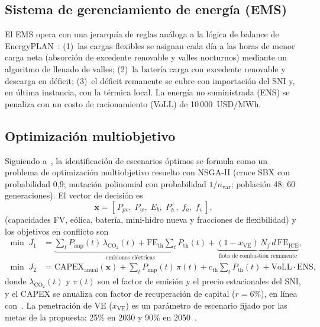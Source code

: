 \documentclass[11pt,a4paper]{article}
\begin{document}
\subsection{Sistema de gerenciamiento de energ\'ia (EMS)}
El EMS opera con una jerarqu\'ia de reglas an\'aloga a la l\'ogica de balance de
EnergyPLAN~\cite{viesi2020}: (1)~las cargas flexibles se asignan cada d\'ia a las horas de
menor carga neta (absorci\'on de excedente renovable y valles nocturnos) mediante un
algoritmo de llenado de valles; (2)~la bater\'ia carga con excedente renovable y descarga
en d\'eficit; (3)~el d\'eficit remanente se cubre con importaci\'on del SNI y, en \'ultima
instancia, con la t\'ermica local. La energ\'ia no suministrada (ENS) se penaliza con un
costo de racionamiento (VoLL) de 10\,000~USD/MWh.

\subsection{Optimizaci\'on multiobjetivo}
Siguiendo a~\cite{viesi2020,mahbub2016}, la identificaci\'on de escenarios \'optimos se formula como
un problema de optimizaci\'on multiobjetivo resuelto con NSGA-II (cruce SBX con
probabilidad 0,9; mutaci\'on polinomial con probabilidad $1/n_{\mathrm{var}}$;
poblaci\'on 48; 60 generaciones). El vector de decisi\'on es
\begin{equation}
\mathbf{x} = [\,P_{pv},\; P_{w},\; E_{b},\; P_{h}^{+},\; f_a,\; f_v\,],
\end{equation}
(capacidades FV, e\'olica, bater\'ia, mini-hidro nueva y fracciones de flexibilidad) y los
objetivos en conflicto son
\begin{align}
\min\; J_1 &= \underbrace{\textstyle\sum_t P_{\mathrm{imp}}(t)\,\lambda_{\mathrm{CO_2}}(t)
 + \mathrm{FE}_{\mathrm{th}}\textstyle\sum_t P_{\mathrm{th}}(t)}_{\text{emisiones el\'ectricas}}
 + \underbrace{(1-x_{\mathrm{VE}})\,N_f\,d\,\mathrm{FE}_{\mathrm{ICE}}}_{\text{flota de combusti\'on remanente}},\\
\min\; J_2 &= \mathrm{CAPEX}_{\mathrm{anual}}(\mathbf{x})
 + \textstyle\sum_t P_{\mathrm{imp}}(t)\,\pi(t)
 + c_{\mathrm{th}}\textstyle\sum_t P_{\mathrm{th}}(t)
 + \mathrm{VoLL}\cdot\mathrm{ENS},
\end{align}
donde $\lambda_{\mathrm{CO_2}}(t)$ y $\pi(t)$ son el factor de emisi\'on y el precio
estacionales del SNI, y el CAPEX se anualiza con factor de recuperaci\'on de capital
($r=6\%$), en l\'inea con~\cite{viesi2020}. La penetraci\'on de VE
($x_{\mathrm{VE}}$) es un par\'ametro de escenario fijado por las metas de la
propuesta: 25\% en 2030 y 90\% en 2050~\cite{formulario2}.
\end{document}
